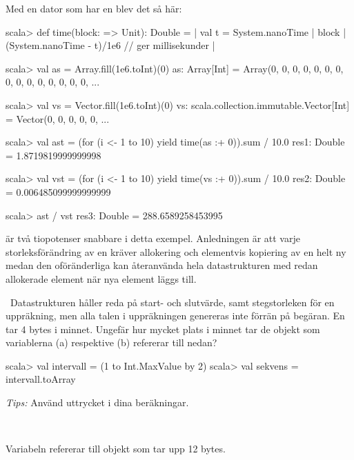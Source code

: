 \SubtaskSolved Med en dator som har en  blev det så här:
\begin{REPL}
scala> def time(block: => Unit): Double = {
     |   val t = System.nanoTime
     |   block
     |   (System.nanoTime - t)/1e6  // ger millisekunder
     | }

scala> val as = Array.fill(1e6.toInt)(0)
as: Array[Int] = Array(0, 0, 0, 0, 0, 0, 0, 0, 0, 0, 0, 0, 0, 0, 0, ...

scala> val vs = Vector.fill(1e6.toInt)(0)
vs: scala.collection.immutable.Vector[Int] = Vector(0, 0, 0, 0, 0, ...

scala> val ast = (for (i <- 1 to 10) yield time(as :+ 0)).sum / 10.0
res1: Double = 1.8719819999999998

scala> val vst = (for (i <- 1 to 10) yield time(vs :+ 0)).sum / 10.0
res2: Double = 0.006485099999999999

scala> ast / vst
res3: Double = 288.6589258453995

\end{REPL}

\SubtaskSolved {} är två tiopotenser snabbare i detta exempel. Anledningen är att varje storleksförändring av en  kräver allokering och elementvis kopiering av en helt ny  medan den oföränderliga  kan återanvända hela datastrukturen med redan allokerade element när nya element läggs till.

\QUESTEND





\QUESTBEGIN

\Task\Uberkurs \what~Datastrukturen  håller reda på start- och slutvärde, samt stegstorleken för en uppräkning, men alla talen i uppräkningen genereras inte förrän på begäran. En  tar 4 bytes i minnet. Ungefär hur mycket plats i minnet tar de objekt som variablerna (a)  respektive (b)  refererar till nedan?

\begin{REPL}
scala> val intervall = (1 to Int.MaxValue by 2)
scala> val sekvens = intervall.toArray
\end{REPL}
\emph{Tips:} Använd uttrycket  i dina beräkningar.


\SOLUTION

\TaskSolved  \what~

\SubtaskSolved Variabeln  refererar till objekt som tar upp 12 bytes.

